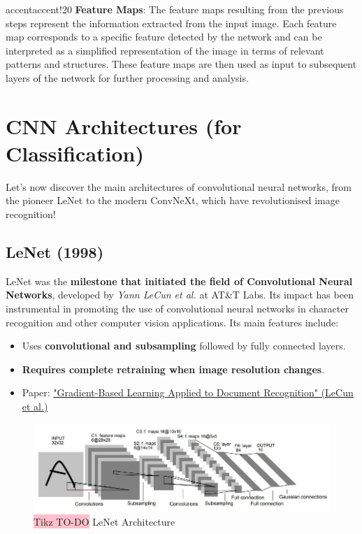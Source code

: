 \begin{remark}{accent}{accent!20}
\textbf{Feature Maps}: The feature maps resulting from the previous steps represent the information extracted from the input image. Each feature map corresponds to a specific feature detected by the network and can be interpreted as a simplified representation of the image in terms of relevant patterns and structures. These feature maps are then used as input to subsequent layers of the network for further processing and analysis.
\end{remark}

\section{CNN Architectures (for Classification)}

Let's now discover the main architectures of convolutional neural networks, from the pioneer LeNet to the modern ConvNeXt, which have revolutionised image recognition!

\subsection{LeNet (1998)}
LeNet was the \textbf{milestone that initiated the field of Convolutional Neural Networks}, developed by \textit{Yann LeCun et al.} at AT\&T Labs. Its impact has been instrumental in promoting the use of convolutional neural networks in character recognition and other computer vision applications. Its main features include:
\begin{itemize}
    \item Uses \textbf{convolutional and subsampling} followed by fully connected layers.
    \item \textbf{Requires complete retraining when image resolution changes}.
    \item Paper: \href{http://vision.stanford.edu/cs598_spring07/papers/Lecun98.pdf}{"Gradient-Based Learning Applied to Document Recognition" (LeCun et al.)}
\end{itemize}

\begin{figure}[!htbp]
    \centering
    \includegraphics[width=\textwidth]{tikz/chapter5 - LeNet.jpeg}
    \caption{{\color{red}\colorbox{pink}{Tikz TO-DO}} LeNet Architecture}
\end{figure}

